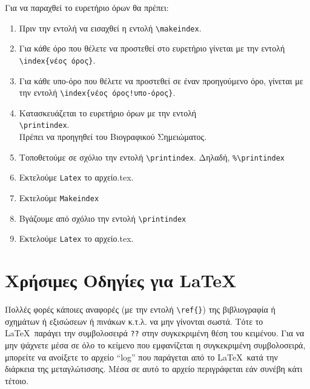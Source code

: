 {\color{red}
Για να παραχθεί το ευρετήριο όρων θα πρέπει:

\begin{enumerate}
  \item Πριν την εντολή \verb|| να εισαχθεί η
  εντολή \verb|\makeindex|.
  \item Για κάθε όρο που θέλετε να προστεθεί στο ευρετήριο γίνεται
  με την εντολή \verb|\index{νέος όρος}|.
  \item Για κάθε υπο-όρο που θέλετε να προστεθεί σε έναν προηγούμενο όρο, γίνεται
  με την εντολή \verb|\index{νέος όρος!υπο-όρος}|.
  \item Κατασκευάζεται το ευρετήριο όρων με την εντολή\\
  \verb|\printindex|. \\Πρέπει να προηγηθεί του Βιογραφικού
  Σημειώματος.
  \item Τοποθετούμε σε σχόλιο την εντολή
  \verb|\printindex|. Δηλαδή,
  \verb|%\printindex|
  \item Εκτελούμε
  \verb|Latex| το αρχείο.tex.
  \item Εκτελούμε
  \verb|Makeindex|
  \item Βγάζουμε από σχόλιο την εντολή
  \verb|\printindex|
  \item Εκτελούμε
  \verb|Latex| το αρχείο.tex.
\end{enumerate}}


\section{Χρήσιμες Οδηγίες για \LaTeX}
\label{sec:LaTeX}

{\color{red}
Πολλές φορές κάποιες αναφορές (με την εντολή \verb|\ref{}|) της
βιβλιογραφία ή σχημάτων ή εξισώσεων ή πινάκων κ.τ.λ. να μην
γίνονται σωστά. Τότε το \LaTeX\ παράγει την συμβολοσειρά \verb|??|
στην συγκεκριμένη θέση του κειμένου. Για να μην ψάχνετε μέσα σε
όλο το κείμενο που εμφανίζεται η συγκεκριμένη συμβολοσειρά,
μπορείτε να ανοίξετε το αρχείο ``log'' που παράγεται από το \LaTeX\
κατά την διάρκεια της μεταγλώτισσης. Μέσα σε αυτό το αρχείο
περιγράφεται εάν συνέβη κάτι τέτοιο.}